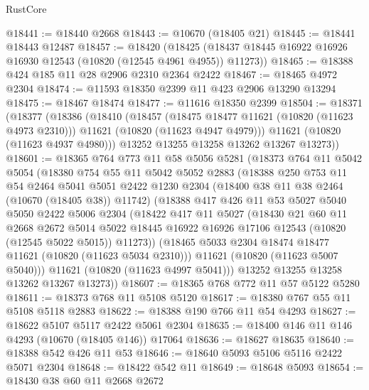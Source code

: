 \begin{lexlean}{RustCore}
\begin{coremodule}
@18441 := @18440 @2668
@18443 := @10670 (@18405 @21)
@18445 := @18441 @18443 @12487
@18457 := @18420
    (@18425 (@18437 @18445 @16922 @16926 @16930 @12543 (@10820 (@12545 @4961 @4955)) @11273))
@18465 := @18388 @424 @185 @11 @28 @2906 @2310 @2364 @2422
@18467 := @18465 @4972 @2304
@18474 := @11593 @18350 @2399 @11 @423 @2906 @13290 @13294
@18475 := @18467 @18474
@18477 := @11616 @18350 @2399
@18504 := @18371
    (@18377
      (@18386
        (@18410
          (@18457
            (@18475 @18477 @11621 (@10820 (@11623 @4973 @2310)))
            @11621
            (@10820 (@11623 @4947 @4979)))
          @11621
          (@10820 (@11623 @4937 @4980)))
        @13252
        @13255
        @13258
        @13262
        @13267
        @13273))
@18601 := @18365
    @764
    @773
    @11
    @58
    @5056
    @5281
    (@18373
      @764
      @11
      @5042
      @5054
      (@18380
        @754
        @55
        @11
        @5042
        @5052
        @2883
        (@18388
          @250
          @753
          @11
          @54
          @2464
          @5041
          @5051
          @2422
          @1230
          @2304
          (@18400 @38 @11 @38 @2464 (@10670 (@18405 @38)) @11742)
          (@18388
            @417
            @426
            @11
            @53
            @5027
            @5040
            @5050
            @2422
            @5006
            @2304
            (@18422
              @417
              @11
              @5027
              (@18430
                @21
                @60
                @11
                @2668
                @2672
                @5014
                @5022
                @18445
                @16922
                @16926
                @17106
                @12543
                (@10820 (@12545 @5022 @5015))
                @11273))
            (@18465 @5033 @2304 @18474 @18477 @11621 (@10820 (@11623 @5034 @2310)))
            @11621
            (@10820 (@11623 @5007 @5040)))
          @11621
          (@10820 (@11623 @4997 @5041)))
        @13252
        @13255
        @13258
        @13262
        @13267
        @13273))
@18607 := @18365 @768 @772 @11 @57 @5122 @5280
@18611 := @18373 @768 @11 @5108 @5120
@18617 := @18380 @767 @55 @11 @5108 @5118 @2883
@18622 := @18388 @190 @766 @11 @54 @4293
@18627 := @18622 @5107 @5117 @2422 @5061 @2304
@18635 := @18400 @146 @11 @146 @4293 (@10670 (@18405 @146)) @17064
@18636 := @18627 @18635
@18640 := @18388 @542 @426 @11 @53
@18646 := @18640 @5093 @5106 @5116 @2422 @5071 @2304
@18648 := @18422 @542 @11
@18649 := @18648 @5093
@18654 := @18430 @38 @60 @11 @2668 @2672

\end{coremodule}
\end{lexlean}
